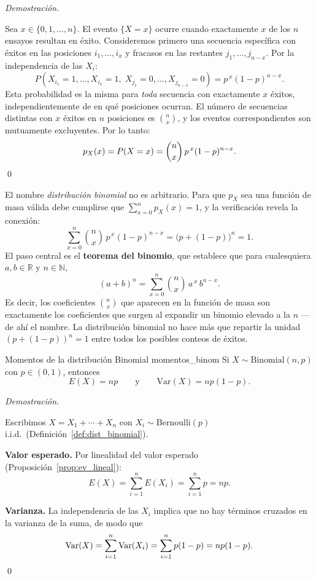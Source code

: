 \documentclass[12pt, a4paper]{book}
\renewenvironment{proof}{%
    \par\medskip\noindent\textit{Demostraci\'{o}n.}\enspace
}{\qed\par\medskip}
\numberwithin{equation}{chapter}
\begin{document}
\begin{proof}
	Sea $x \in \{0,1,\ldots,n\}$. El evento $\{X = x\}$ ocurre cuando
	exactamente $x$ de los $n$ ensayos resultan en éxito. Consideremos
	primero una secuencia específica con éxitos en las posiciones
	$i_1,\ldots,i_x$ y fracasos en las restantes $j_1,\ldots,j_{n-x}$.
	Por la independencia de las $X_i$:
	\[
	P\!\left(X_{i_1}=1,\ldots,X_{i_x}=1,\;
	X_{j_1}=0,\ldots,X_{j_{n-x}}=0\right)
	= p^{\,x}(1-p)^{n-x}.
	\]
	Esta probabilidad es la misma para \emph{toda} secuencia con
	exactamente $x$ éxitos, independientemente de en qué posiciones
	ocurran. El número de secuencias distintas con $x$ éxitos en $n$
	posiciones es $\binom{n}{x}$, y los eventos correspondientes son
	mutuamente excluyentes. Por lo tanto:
	\[
	p_X(x) = P(X=x) = \binom{n}{x}\,p^{\,x}(1-p)^{n-x}. \qedhere
	\]
\end{proof}

El nombre \emph{distribución binomial} no es arbitrario. Para que
$p_X$ sea una función de masa válida debe cumplirse que
$\sum_{x=0}^{n} p_X(x) = 1$, y la verificación revela la conexión:
\[
\sum_{x=0}^{n} \binom{n}{x}\, p^{\,x}(1-p)^{n-x}
= \bigl(p + (1-p)\bigr)^n = 1.
\]
El paso central es el \textbf{teorema del binomio}, que establece que
para cualesquiera $a, b \in \mathbb{R}$ y $n \in \mathbb{N}$,
\[
(a+b)^n = \sum_{x=0}^{n} \binom{n}{x}\, a^{\,x}\, b^{n-x}.
\]
Es decir, los coeficientes $\binom{n}{x}$ que aparecen en la función
de masa son exactamente los coeficientes que surgen al expandir un
binomio elevado a la $n$ --- de ahí el nombre. La distribución binomial
no hace más que repartir la unidad $(p + (1-p))^n = 1$ entre todos los
posibles conteos de éxitos.

\begin{proposicion}{Momentos de la distribuci\'{o}n Binomial}
	{momentos_binom}
	Si $X \sim \mathrm{Binomial}(n,p)$ con $p \in (0,1)$, entonces
	\[
	E(X) = np \qquad \text{y} \qquad \mathrm{Var}(X) = np(1-p).
	\]
\end{proposicion}

\begin{proof}
	Escribimos $X = X_1 + \cdots + X_n$ con $X_i \sim \mathrm{Bernoulli}(p)$
	i.i.d.\ (Definición~\ref{def:dist_binomial}).
	
	\textbf{Valor esperado.} Por linealidad del valor esperado
	(Proposición~\ref{prop:ev_lineal}):
	\[
	E(X) = \sum_{i=1}^{n} E(X_i) = \sum_{i=1}^{n} p = np.
	\]
	
	\textbf{Varianza.} La independencia de las $X_i$ implica que no
	hay términos cruzados en la varianza de la suma, de modo que
	\[
	\mathrm{Var}(X) = \sum_{i=1}^{n} \mathrm{Var}(X_i)
	= \sum_{i=1}^{n} p(1-p) = np(1-p). \qedhere
	\]
\end{proof}
\end{document}
